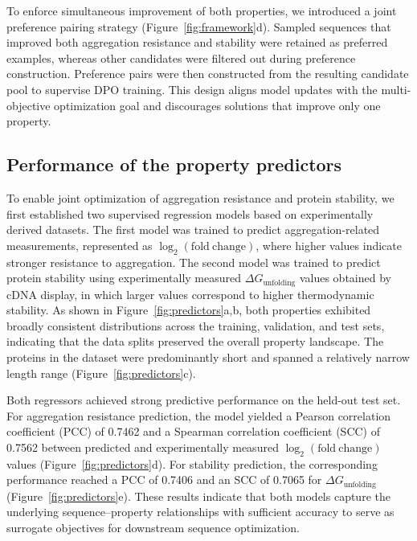 \documentclass[pdflatex,sn-mathphys-num]{sn-jnl}%
\theoremstyle{thmstyleone}%
\theoremstyle{thmstyletwo}%
\theoremstyle{thmstylethree}%
\begin{document}
To enforce simultaneous improvement of both properties, we introduced a joint preference pairing strategy (Figure~\ref{fig:framework}d). Sampled sequences that improved both aggregation resistance and stability were retained as preferred examples, whereas other candidates were filtered out during preference construction. Preference pairs were then constructed from the resulting candidate pool to supervise DPO training. This design aligns model updates with the multi-objective optimization goal and discourages solutions that improve only one property.



\subsection{Performance of the property predictors}
\FloatBarrier

To enable joint optimization of aggregation resistance and protein stability, we first established two supervised regression models based on experimentally derived datasets. The first model was trained to predict aggregation-related measurements, represented as $\log_2(\mathrm{fold\ change})$, where higher values indicate stronger resistance to aggregation. The second model was trained to predict protein stability using experimentally measured $\Delta G_{\mathrm{unfolding}}$ values obtained by cDNA display, in which larger values correspond to higher thermodynamic stability. As shown in Figure~\ref{fig:predictors}a,b, both properties exhibited broadly consistent distributions across the training, validation, and test sets, indicating that the data splits preserved the overall property landscape. The proteins in the dataset were predominantly short and spanned a relatively narrow length range (Figure~\ref{fig:predictors}c).

Both regressors achieved strong predictive performance on the held-out test set. For aggregation resistance prediction, the model yielded a Pearson correlation coefficient (PCC) of 0.7462 and a Spearman correlation coefficient (SCC) of 0.7562 between predicted and experimentally measured $\log_2(\mathrm{fold\ change})$ values (Figure~\ref{fig:predictors}d). For stability prediction, the corresponding performance reached a PCC of 0.7406 and an SCC of 0.7065 for $\Delta G_{\mathrm{unfolding}}$ (Figure~\ref{fig:predictors}e). These results indicate that both models capture the underlying sequence--property relationships with sufficient accuracy to serve as surrogate objectives for downstream sequence optimization.
\end{document}

